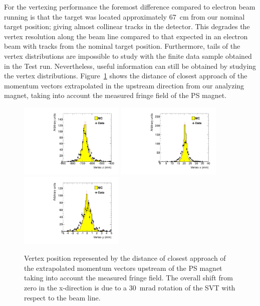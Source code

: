 \documentclass[final,3p,times,twocolumn]{elsarticle}
\begin{document}
For the vertexing performance the foremost difference compared to electron beam running is that the 
target was located approximately 67~cm from our nominal target position; giving almost collinear tracks 
in the detector. This degrades the vertex resolution along the 
beam line compared to that expected in an electron beam with tracks from the nominal target position. 
Furthermore, tails of the vertex distributions are impossible to study with the finite data sample obtained 
in the Test run. Nevertheless, useful information can still be 
obtained by studying the vertex distributions. Figure~\ref{fig:vtx_pos} shows the distance of closest 
approach of the momentum vectors extrapolated in the upstream direction from our analyzing magnet, 
taking into account the measured fringe field of the PS magnet. 
 \begin{center}
{\small
	 \begin{figure}[t]
	\includegraphics[width=5cm]{figures/h_vtx_fr_x_h_vtx_x_trigsel4hit_pair1351_twotrkfilt-v6-paper}
	\includegraphics[width=5cm]{figures/h_vtx_fr_y_h_vtx_y_trigsel4hit_pair1351_twotrkfilt-v6-paper}
	\includegraphics[width=5cm]{figures/h_vtx_fr_z_h_vtx_z_trigsel4hit_pair1351_twotrkfilt-v6-paper}
	\caption{ Vertex position represented by the distance of closest approach of the extrapolated 
	momentum vectors upstream of the PS magnet taking into account the measured fringe field. The 
	overall shift from zero in the x-direction is due to a 30~mrad rotation of the SVT with respect to the 
	beam line.}
	\label{fig:vtx_pos}
\end{figure}
}
\end{center}
\end{document}
